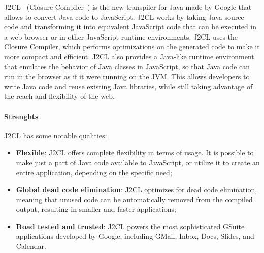 J2CL~\cite{googlej257:online} (Closure Compiler~\cite{googlecl76:online}) is the new transpiler for Java made by Google that allows to convert Java code to JavaScript. J2CL works by taking Java source code and transforming it into equivalent JavaScript code that can be executed in a web browser or in other JavaScript runtime environments. J2CL uses the Closure Compiler, which performs optimizations on the generated code to make it more compact and efficient. J2CL also provides a Java-like runtime environment that emulates the behavior of Java classes in JavaScript, so that Java code can run in the browser as if it were running on the JVM. This allows developers to write Java code and reuse existing Java libraries, while still taking advantage of the reach and flexibility of the web.

\paragraph{Strenghts} J2CL has some notable qualities:
\begin{itemize}
	\item \textbf{Flexible}: J2CL offers complete flexibility in terms of usage. It is possible to make just a part of Java code available to JavaScript, or utilize it to create an entire application, depending on the specific need;
	\item \textbf{Global dead code elimination}: J2CL optimizes for dead code elimination, meaning that unused code can be automatically removed from the compiled output, resulting in smaller and faster applications;
	\item \textbf{Road tested and trusted}: J2CL powers the most sophisticated GSuite applications developed by Google, including GMail, Inbox, Docs, Slides, and Calendar.
\end{itemize}

